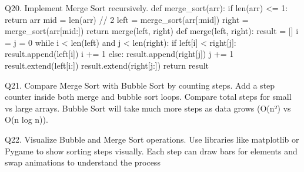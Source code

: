  Q20. Implement Merge Sort recursively.
 def merge_sort(arr):
 if len(arr) <= 1:
 return arr
 mid = len(arr) // 2
 left = merge_sort(arr[:mid])
 right = merge_sort(arr[mid:])
 return merge(left, right)
 def merge(left, right):
 result = []
 i = j = 0
 while i < len(left) and j < len(right):
 if left[i] < right[j]:
 result.append(left[i])
 i += 1
 else:
 result.append(right[j])
 j += 1
 result.extend(left[i:])
 result.extend(right[j:])
 return result



 Q21. Compare Merge Sort with Bubble Sort by counting steps.
 Add a step counter inside both merge and bubble sort loops.
 Compare total steps for small vs large arrays.
 Bubble Sort will take much more steps as data grows (O(n²) vs O(n log n)).



 Q22. Visualize Bubble and Merge Sort operations.
 Use libraries like matplotlib or Pygame to show sorting steps visually.
 Each step can draw bars for elements and swap animations to understand the process
